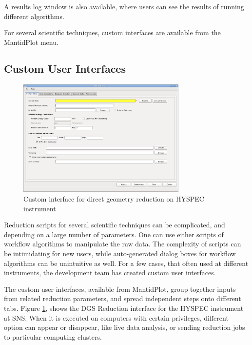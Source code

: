 \documentclass{elsarticle}
\begin{document}
A results log window is also available, where users can see the results of running different algorithms.

For several scientific techniques, custom interfaces are available from the MantidPlot menu.



\subsection{Custom User Interfaces}
\begin{figure}[!ht]
\centerline{\includegraphics[width=0.75\textwidth]{Hyspec.png}}
\caption{Custom interface for direct geometry reduction on HYSPEC instrument}
\label{fig:Hyspec}
\end{figure}
Reduction scripts for several scientific techniques can be complicated, and depending on a large number of parameters. One can use either scripts of workflow algorithms to manipulate the raw data. The complexity of scripts can be intimidating for new users, while auto-generated dialog boxes for workflow algorithms can be unintuitive as well. For a few cases, that often used at different instruments, the development team has created custom user interfaces.

The custom user interfaces, available from MantidPlot, group together inputs from related reduction parameters, and spread independent steps onto different tabs. Figure \ref{fig:Hyspec}, shows the DGS Reduction interface for the HYSPEC instrument at SNS. When it is executed on computers with certain privileges, different option can appear or disappear, like live data analysis, or sending reduction jobs to particular computing clusters.
\end{document}

